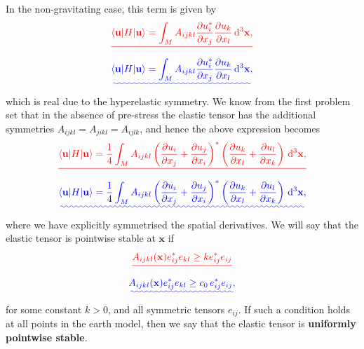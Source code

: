 \documentclass[a4paper,12pt]{paper}
\providecommand{\DIFadd}[1]{{\protect\color{blue}\uwave{#1}}} %
\providecommand{\DIFdel}[1]{{\protect\color{red}\sout{#1}}}                      %
\providecommand{\DIFaddbegin}{} %
\providecommand{\DIFaddend}{} %
\providecommand{\DIFdelbegin}{} %
\providecommand{\DIFdelend}{} %
\begin{document}
In the non-gravitating case, this term is given by
\DIFdelbegin \begin{displaymath}
\DIFdel{\langle \mathbf{u}|H|\mathbf{u}\rangle=\int_{M}A_{ijkl}\frac{\partial u_{i}^{*}}{\partial x_{j}}\frac{\partial u_{k}}{\partial x_{l}}\dd^{3}\mathbf{x},
}\end{displaymath}%
\DIFdelend \DIFaddbegin \begin{equation}
\DIFadd{\langle \mathbf{u}|H|\mathbf{u}\rangle=\int_{M}A_{ijkl}\frac{\partial u_{i}^{*}}{\partial x_{j}}\frac{\partial u_{k}}{\partial x_{l}}\dd^{3}\mathbf{x},
\label{eq:39}
}\end{equation}\DIFaddend 
which is real due to the hyperelastic symmetry. We know from the first problem set that in the absence of pre-stress the elastic tensor has the additional 
symmetries $A_{ijkl}=A_{jikl}=A_{ijlk}$, and hence the above expression becomes
\DIFdelbegin \begin{displaymath}
\DIFdel{\langle \mathbf{u}|H|\mathbf{u}\rangle=\frac{1}{4}\int_{M}A_{ijkl}\left(\frac{\partial u_{i}}{\partial x_{j}}
+\frac{\partial u_{j}}{\partial x_{i}}\right)^{*}\left(\frac{\partial u_{k}}{\partial x_{l}}+\frac{\partial u_{l}}{\partial x_{k}}\right)\dd^{3}\mathbf{x},
}\end{displaymath}%
\DIFdelend \DIFaddbegin \begin{equation}
\DIFadd{\langle \mathbf{u}|H|\mathbf{u}\rangle=\frac{1}{4}\int_{M}A_{ijkl}\left(\frac{\partial u_{i}}{\partial x_{j}}
+\frac{\partial u_{j}}{\partial x_{i}}\right)^{*}\left(\frac{\partial u_{k}}{\partial x_{l}}+\frac{\partial u_{l}}{\partial x_{k}}\right)\dd^{3}\mathbf{x},
\label{eq:40}
}\end{equation}\DIFaddend 
where we have explicitly symmetrised the spatial derivatives. We will say that the elastic tensor is pointwise stable at $\mathbf{x}$ if
\DIFdelbegin \begin{displaymath}
\DIFdel{A_{ijkl}(\mathbf{x})e_{ij}^{*}e_{kl}\ge ke_{ij}^{*}e_{ij}
}\end{displaymath}%
\DIFdelend \DIFaddbegin \begin{equation}
\DIFadd{A_{ijkl}(\mathbf{x})e_{ij}^{*}e_{kl}\ge c_{0}\,e_{ij}^{*}e_{ij},
\label{eq:41}
}\end{equation}\DIFaddend 
for some constant \DIFdelbegin \DIFdel{$k>0$}\DIFdelend \DIFaddbegin \DIFadd{$c_{0}>0$}\DIFaddend , and all symmetric tensors $e_{ij}$. If such a condition holds at all points in the earth model, then we say that the elastic tensor is \textbf{uniformly pointwise stable}.
\end{document}
